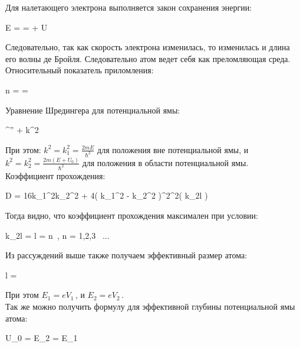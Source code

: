 Для налетающего электрона выполняется закон сохранения энергии:

{E =  =  + U}

Следовательно, так как скорость электрона изменилась, то изменилась и длина его волны
де Бройля. Следовательно атом ведет себя как преломляющая среда. Относительный
показатель приломления:

{n =  = }

Уравнение Шредингера для потенциальной ямы:

{\psi^{''} + k^2\psi}

При этом: $ k^2 = k_1^2 = \frac{2mE}{\hslash^2} $ для положения вне потенциальной ямы, и
$ k^2 = k_2^2 = \frac{2m\left( E + U_0 \right)}{\hslash^2} $ для положения в области
потенциальной ямы. \\

Коэффициент прохождения:

{
    D = 
        {16k_1^2k_2^2 + 4\left( k_1^2 - k_2^2 \right)^2\sin^2\left( k_2l \right)}
}

Тогда видно, что коэффициент прохождения максимален при условии:

{k_2l = l = n\pi \, , \quad n = 1,2,3 \, ...}

Из рассуждений выше также получаем эффективный размер атома:

{l = }

При этом $ E_1 = eV_1 \, $, и $ E_2 = eV_2 \, $. \\

Так же можно получить формулу для эффективной глубины потенциальной ямы атома:

{U_0 = E_2 = E_1}
